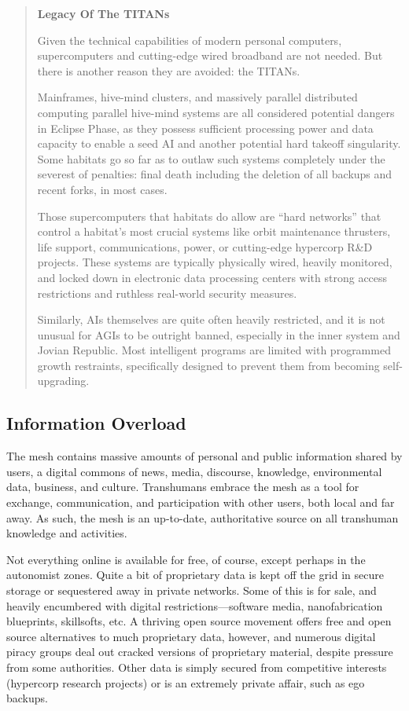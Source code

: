 \begin{quotation}
\textbf{Legacy Of The TITANs}

Given the technical capabilities of modern personal computers, supercomputers and cutting-edge wired
broadband are not needed. But there is another reason they are avoided: the TITANs.

Mainframes, hive-mind clusters, and massively parallel distributed computing parallel hive-mind systems
are all considered potential dangers in Eclipse Phase, as they possess sufficient processing power and data
capacity to enable a seed AI and another potential hard takeoff singularity. Some habitats go so far as to
outlaw such systems completely under the severest of penalties: final death including the deletion of all
backups and recent forks, in most cases.

Those supercomputers that habitats do allow are “hard networks” that control a habitat’s most crucial
systems like orbit maintenance thrusters, life support, communications, power, or cutting-edge hypercorp
R\&D projects. These systems are typically physically wired, heavily monitored, and locked down in electronic
data processing centers with strong access restrictions and ruthless real-world security measures.

Similarly, AIs themselves are quite often heavily restricted, and it is not unusual for AGIs to be outright
banned, especially in the inner system and Jovian Republic. Most intelligent programs are limited with
programmed growth restraints, specifically designed to prevent them from becoming self-upgrading.
\end{quotation}

\subsection{Information Overload}

The mesh contains massive amounts of personal and 
public information shared by users, a digital commons 
of news, media, discourse, knowledge, environmental 
data, business, and culture. Transhumans embrace 
the mesh as a tool for exchange, communication, 
and participation with other users, both local and far 
away. As such, the mesh is an up-to-date, authoritative 
source on all transhuman knowledge and activities.

Not everything online is available for free, of course, 
except perhaps in the autonomist zones. Quite a bit of 
proprietary data is kept off the grid in secure storage 
or sequestered away in private networks. Some of this 
is for sale, and heavily encumbered with digital restrictions—software
media, nanofabrication blueprints,
skillsofts, etc. A thriving open source movement offers 
free and open source alternatives to much proprietary 
data, however, and numerous digital piracy groups 
deal out cracked versions of proprietary material, 
despite pressure from some authorities. Other data is 
simply secured from competitive interests (hypercorp 
research projects) or is an extremely private affair, 
such as ego backups.


